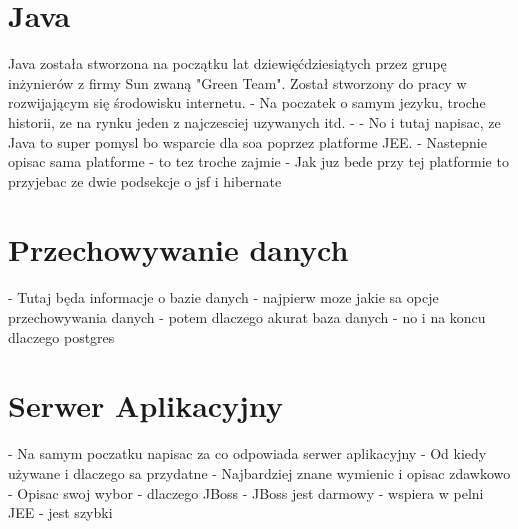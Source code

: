 \section{Java}
\label{sec:java}

Java została stworzona na początku lat dziewięćdziesiątych przez grupę inżynierów z firmy Sun zwaną "Green Team". Został stworzony do pracy w rozwijającym się środowisku internetu.
- Na poczatek o samym jezyku, troche historii, ze na rynku jeden z najczesciej uzywanych itd.\newline
- 
- No i tutaj napisac, ze Java to super pomysl bo wsparcie dla soa poprzez platforme JEE. \newline
- Nastepnie opisac sama platforme - to tez troche zajmie \newline
- Jak juz bede przy tej platformie to przyjebac ze dwie podsekcje o jsf i hibernate \newline


\section{Przechowywanie danych}
\label{sec:bazadanych}

- Tutaj będa informacje o bazie danych \newline
- najpierw moze jakie sa opcje przechowywania danych \newline
- potem dlaczego akurat baza danych \newline
- no i na koncu dlaczego postgres \newline
\section{Serwer Aplikacyjny}
\label{sec:serweraplikacyjny}

- Na samym poczatku napisac za co odpowiada serwer aplikacyjny \newline
- Od kiedy używane i dlaczego sa przydatne \newline
- Najbardziej znane wymienic i opisac zdawkowo \newline
- Opisac swoj wybor - dlaczego JBoss \newline
- JBoss jest darmowy \newline
- wspiera w pelni JEE \newline
- jest szybki \newline